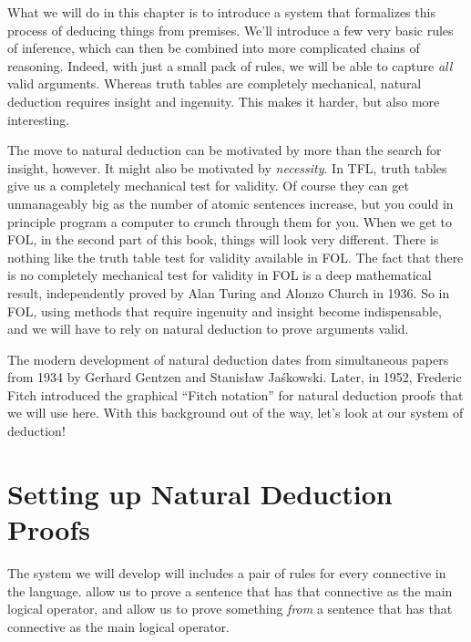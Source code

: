 What we will do in this chapter is to introduce a  system that formalizes this process of deducing things from premises. We'll introduce a few very basic rules of inference, which can then be combined into more complicated chains of reasoning. Indeed, with just a small pack of rules, we will be able to capture \emph{all} valid arguments.   Whereas truth tables are completely mechanical, natural deduction requires insight and ingenuity.  This makes it harder, but also more interesting.

The move to natural deduction can be motivated by more than the search for insight, however. It might also be motivated by \emph{necessity}. In TFL, truth tables give us a  completely mechanical test for validity.  Of course they can get unmanageably big as the number of atomic sentences increase, but you could in principle program a computer to crunch through them for you.   When we get to FOL, in the second part of this book, things will look very different. There is nothing like the truth table test for validity available in FOL.  The fact that there is no completely mechanical test for validity in FOL is a deep mathematical result, independently proved by Alan Turing and Alonzo Church in 1936.  So in FOL, using methods that require ingenuity and insight become indispensable, and we will have to rely on natural deduction to prove arguments valid.

The modern development of natural deduction dates from simultaneous papers from 1934 by Gerhard Gentzen and Stanis\l{}aw Ja\'{s}kowski.   Later, in 1952, Frederic Fitch introduced the graphical ``Fitch notation'' for natural deduction proofs that we will use here.  With this background out of the way, let's look at our system of deduction!



\section{Setting up Natural Deduction Proofs}\label{s:BasicTFL}

The  system we will develop will includes a pair of rules for every connective in the language.   allow us to prove a sentence that has that connective as the main logical operator, and  allow us to prove something \emph{from} a sentence that has that connective as the main logical operator.  %

